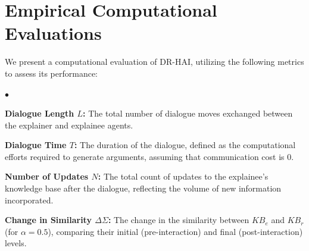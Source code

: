 \documentclass[letterpaper]{article} %
\newcommand{\squishlist}{
\begin{list}{$\bullet$}{ 
    \setlength{\itemsep}{1pt}
    \setlength{\parsep}{0pt}
    \setlength{\topsep}{1.5pt}
    \setlength{\partopsep}{0pt}
    \setlength{\leftmargin}{1em}
    \setlength{\labelwidth}{1em}
    \setlength{\labelsep}{0.5em} } }
\newcommand{\squishend}{\end{list}  }
\begin{document}
\section{Empirical Computational Evaluations}
\label{comp-eval}

We present a computational evaluation of DR-HAI, utilizing the following metrics to assess its performance:



\squishlist
\item \textbf{Dialogue Length $L$:} The total number of dialogue moves exchanged between the explainer and explainee agents.
\item \textbf{Dialogue Time $T$:} The duration of the dialogue, defined as the computational efforts required to generate arguments, assuming that communication cost is $0$.

\item \textbf{Number of Updates $N$:} The total count of updates to the explainee's knowledge base after the dialogue, reflecting the volume of new information incorporated.



\item \textbf{Change in Similarity $\Delta \Sigma$:} The change in the similarity between $KB_e$ and $KB_r$ (for $\alpha =0.5$), comparing their initial (pre-interaction) and final (post-interaction) levels. 


\squishend
\end{document}

